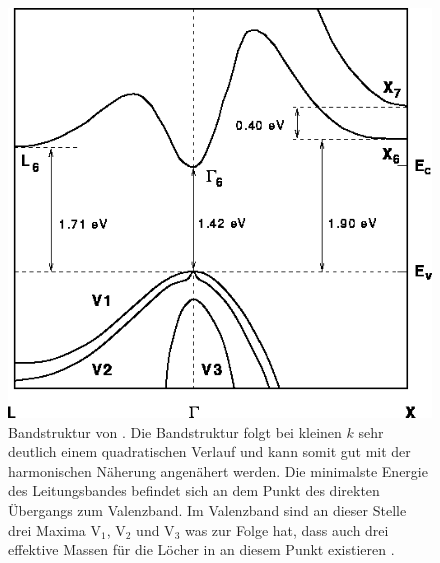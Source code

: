 \begin{figure}[H]
  \centering
  \includegraphics[width = .4\textwidth]{images/Bandstruktur_GaAs.png}
  \caption{Bandstruktur von . Die Bandstruktur folgt bei kleinen $k$ sehr deutlich einem quadratischen Verlauf und kann somit gut mit der harmonischen Näherung angenähert werden. Die minimalste Energie des Leitungsbandes befindet sich an dem Punkt des direkten Übergangs zum Valenzband. Im Valenzband sind an dieser Stelle drei Maxima V$_1$, V$_2$ und V$_3$ was zur Folge hat, dass auch drei effektive Massen für die Löcher in  an diesem Punkt existieren \cite{Band_GaAs}.}
  \label{fig:Band_GaAs}
\end{figure}



